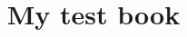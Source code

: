 \documentclass[11pt]{book}
\title{My test book}
\author{}
\begin{document}
\maketitle
\def\title#1{\chapter{#1}}
\tableofcontents

        
        
\end{document}
